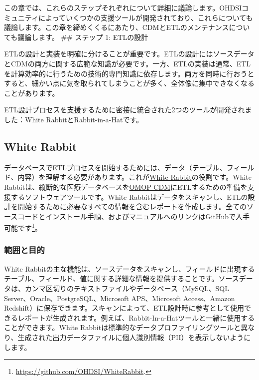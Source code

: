 \documentclass[
  11pt]{book}
\theoremstyle{definition}
\theoremstyle{definition}
\theoremstyle{definition}
\theoremstyle{definition}
\theoremstyle{remark}
\begin{document}
この章では、これらのステップそれぞれについて詳細に議論します。OHDSIコミュニティによっていくつかの支援ツールが開発されており、これらについても議論します。この章を締めくくるにあたり、CDMとETLのメンテナンスについても議論します。
\#\# ステップ 1: ETLの設計

ETLの設計と実装を明確に分けることが重要です。ETLの設計にはソースデータとCDMの両方に関する広範な知識が必要です。一方、ETLの実装は通常、ETLを計算効率的に行うための技術的専門知識に依存します。両方を同時に行おうとすると、細かい点に気を取られてしまうことが多く、全体像に集中できなくなることがあります。

ETL設計プロセスを支援するために密接に統合された2つのツールが開発されました：White RabbitとRabbit-in-a-Hatです。

\subsection{White Rabbit}\label{white-rabbit}

データベースでETLプロセスを開始するためには、データ（テーブル、フィールド、内容）を理解する必要があります。これが\href{https://github.com/OHDSI/WhiteRabbit}{White Rabbit}の役割です。White Rabbitは、縦断的な医療データベースを\href{https://github.com/OHDSI/CommonDataModel}{OMOP CDM}にETLするための準備を支援するソフトウェアツールです。White Rabbitはデータをスキャンし、ETLの設計を開始するために必要なすべての情報を含むレポートを作成します。全てのソースコードとインストール手順、およびマニュアルへのリンクはGitHubで入手可能です\footnote{\url{https://github.com/OHDSI/WhiteRabbit}.}。 

\subsubsection*{範囲と目的}\label{ux7bc4ux56f2ux3068ux76eeux7684}

White Rabbitの主な機能は、ソースデータをスキャンし、フィールドに出現するテーブル、フィールド、値に関する詳細な情報を提供することです。ソースデータは、カンマ区切りのテキストファイルやデータベース（MySQL、SQL Server、Oracle、PostgreSQL、Microsoft APS、Microsoft Access、Amazon Redshift）に保存できます。スキャンによって、ETL設計時に参考として使用できるレポートが生成されます。例えば、Rabbit-In-a-Hatツールと一緒に使用することができます。White Rabbitは標準的なデータプロファイリングツールと異なり、生成された出力データファイルに個人識別情報（PII）を表示しないようにします。
\end{document}

